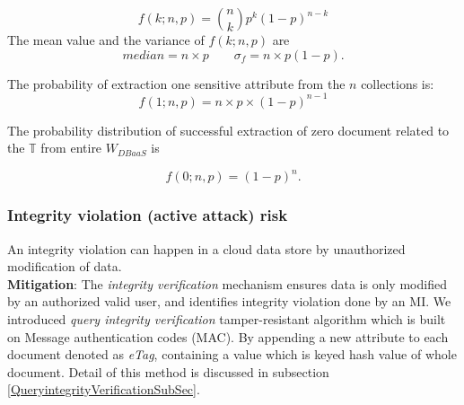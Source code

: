 \begin{equation}
\label{binomialDistribution}
f(k;n,p) = {{n} \choose {k}}p^{k}(1-p)^{n-k}
\end{equation}
The mean value and the variance of $f(k;n,p)$ are
\begin{equation}
median = n \times p  \qquad \sigma_{f} = n \times p (1-p).
\end{equation}

The probability of extraction one sensitive attribute from the $n$ collections is:
\begin{equation}
\label{oneSuccess}
f(1;n,p) = n\times p\times(1-p)^{n-1}
\end{equation}

The probability distribution of successful extraction of zero document related to the $\mathbb{T}$ from  entire $W_{DBaaS}$ is

\begin{equation}
\label{zeroSuccess}
f(0;n,p) = (1-p)^{n}.
\end{equation}
 
\subsubsection*{Integrity violation (active attack) risk}
\label{subsec:IntegrityViolation}
An integrity violation can happen in a cloud data store by unauthorized modification of data.\\
\textbf{Mitigation}: The \emph{integrity verification} mechanism ensures data is only modified by an authorized valid user, and identifies integrity violation done by an  MI. We introduced \emph{query integrity verification} tamper-resistant algorithm which is built on Message authentication codes (MAC). By appending a new attribute to each document denoted as \emph{eTag}, containing a value which is keyed hash value of whole document. Detail of this method is discussed in subsection \ref{QueryintegrityVerificationSubSec}.\\

